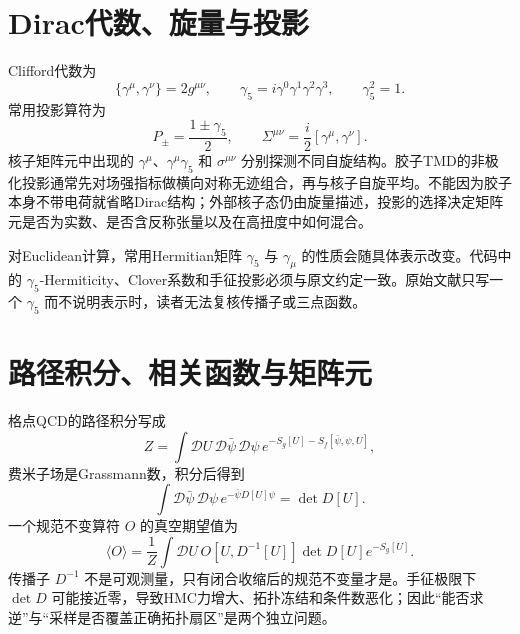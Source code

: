 \documentclass[UTF8,12pt,a4paper,twoside,openany]{ctexbook}
\begin{document}
\section{Dirac代数、旋量与投影}

Clifford代数为
\begin{equation}
  \{\gamma^\mu,\gamma^\nu\}=2g^{\mu\nu},
  \qquad
  \gamma_5=i\gamma^0\gamma^1\gamma^2\gamma^3,
  \qquad
  \gamma_5^2=1.
  \label{eq:toolbox-clifford}
\end{equation}
常用投影算符为
\begin{equation}
  P_\pm=\frac{1\pm\gamma_5}{2},
  \qquad
  \Sigma^{\mu\nu}=\frac{i}{2}[\gamma^\mu,\gamma^\nu].
  \label{eq:toolbox-projectors}
\end{equation}
核子矩阵元中出现的 \(\gamma^\mu\)、\(\gamma^\mu\gamma_5\) 和 \(\sigma^{\mu\nu}\) 分别探测不同自旋结构。胶子TMD的非极化投影通常先对场强指标做横向对称无迹组合，再与核子自旋平均。不能因为胶子本身不带电荷就省略Dirac结构；外部核子态仍由旋量描述，投影的选择决定矩阵元是否为实数、是否含反称张量以及在高扭度中如何混合。

对Euclidean计算，常用Hermitian矩阵 \(\gamma_5\) 与 \(\gamma_\mu\) 的性质会随具体表示改变。代码中的 \(\gamma_5\)-Hermiticity、Clover系数和手征投影必须与原文约定一致。原始文献只写一个 \(\gamma_5\) 而不说明表示时，读者无法复核传播子或三点函数。

\section{路径积分、相关函数与矩阵元}

格点QCD的路径积分写成
\begin{equation}
  Z=\int\mathcal D U\,\mathcal D\bar\psi\,\mathcal D\psi\,
  e^{-S_g[U]-S_f[\bar\psi,\psi,U]},
  \label{eq:toolbox-pathintegral}
\end{equation}
费米子场是Grassmann数，积分后得到
\begin{equation}
  \int\mathcal D\bar\psi\,\mathcal D\psi\,
  e^{-\bar\psi D[U]\psi}
  =\det D[U].
  \label{eq:toolbox-fermiondet}
\end{equation}
一个规范不变算符 \(O\) 的真空期望值为
\begin{equation}
  \langle O\rangle
  =\frac{1}{Z}\int\mathcal DU\,O[U,D^{-1}[U]]\det D[U]e^{-S_g[U]}.
  \label{eq:toolbox-vev}
\end{equation}
传播子 \(D^{-1}\) 不是可观测量，只有闭合收缩后的规范不变量才是。手征极限下 \(\det D\) 可能接近零，导致HMC力增大、拓扑冻结和条件数恶化；因此“能否求逆”与“采样是否覆盖正确拓扑扇区”是两个独立问题。
\end{document}
